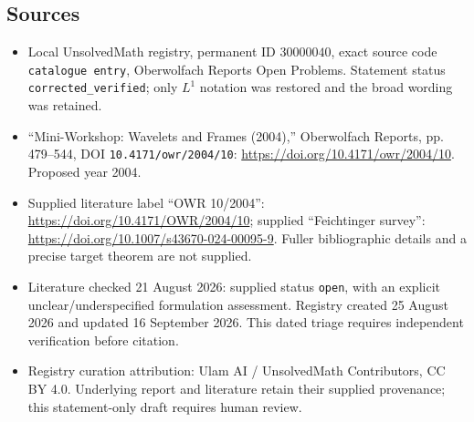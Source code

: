 \documentclass[11pt]{article}
\begin{document}
\subsection{Sources}
\begin{itemize}
\item Local UnsolvedMath registry, permanent ID \(30000040\), exact source code \texttt{catalogue entry}, Oberwolfach Reports Open Problems. Statement status \texttt{corrected\_verified}; only \(L^1\) notation was restored and the broad wording was retained.
\item ``Mini-Workshop: Wavelets and Frames (2004),'' Oberwolfach Reports, pp. 479--544, DOI \texttt{10.4171/owr/2004/10}: \url{https://doi.org/10.4171/owr/2004/10}. Proposed year 2004.
\item Supplied literature label ``OWR 10/2004'': \url{https://doi.org/10.4171/OWR/2004/10}; supplied ``Feichtinger survey'': \url{https://doi.org/10.1007/s43670-024-00095-9}. Fuller bibliographic details and a precise target theorem are not supplied.
\item Literature checked 21 August 2026: supplied status \texttt{open}, with an explicit unclear/underspecified formulation assessment. Registry created 25 August 2026 and updated 16 September 2026. This dated triage requires independent verification before citation.
\item Registry curation attribution: Ulam AI / UnsolvedMath Contributors, CC BY 4.0. Underlying report and literature retain their supplied provenance; this statement-only draft requires human review.
\end{itemize}
\end{document}
